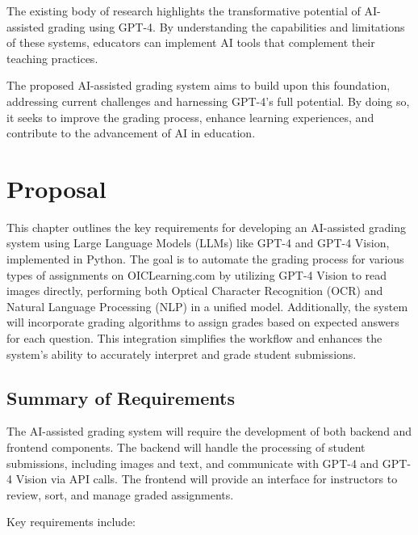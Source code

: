 \documentclass[ms,twoside,print]{nuthesis}
\begin{document}
The existing body of research highlights the transformative potential of AI-assisted grading using GPT-4. By understanding the capabilities and limitations of these systems, educators can implement AI tools that complement their teaching practices.

The proposed AI-assisted grading system aims to build upon this foundation, addressing current challenges and harnessing GPT-4's full potential. By doing so, it seeks to improve the grading process, enhance learning experiences, and contribute to the advancement of AI in education.

\chapter{Proposal}

This chapter outlines the key requirements for developing an AI-assisted grading system using Large Language Models (LLMs) like GPT-4 and GPT-4 Vision, implemented in Python. The goal is to automate the grading process for various types of assignments on OICLearning.com by utilizing GPT-4 Vision to read images directly, performing both Optical Character Recognition (OCR) and Natural Language Processing (NLP) in a unified model. Additionally, the system will incorporate grading algorithms to assign grades based on expected answers for each question. This integration simplifies the workflow and enhances the system's ability to accurately interpret and grade student submissions.

\section{Summary of Requirements}

The AI-assisted grading system will require the development of both backend and frontend components. The backend will handle the processing of student submissions, including images and text, and communicate with GPT-4 and GPT-4 Vision via API calls. The frontend will provide an interface for instructors to review, sort, and manage graded assignments.

Key requirements include:
\end{document}
